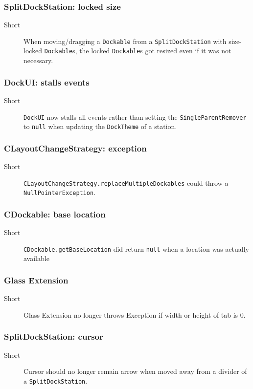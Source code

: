 \documentclass[a4paper,10pt]{article}
\newcommand{\src}[1]{\lstinline[basicstyle=\normalsize\ttfamily,keywordstyle=\normalsize\ttfamily,identifierstyle=\normalsize\ttfamily]|#1|}
\newcommand{\short}{\item[Short]}
\begin{document}
\subsubsection{SplitDockStation: locked size}
\begin{description}
 \short When moving/dragging a \src{Dockable} from a \src{SplitDockStation} with size-locked \src{Dockable}s, the locked \src{Dockable}s got resized even if it was not necessary.
\end{description}

\subsubsection{DockUI: stalls events}
\begin{description}
 \short \src{DockUI} now stalls all events rather than setting the \src{SingleParentRemover} to \src{null} when updating the \src{DockTheme} of a station.
\end{description}


\subsubsection{CLayoutChangeStrategy: exception}
\begin{description}
 \short \src{CLayoutChangeStrategy.replaceMultipleDockables} could throw a \src{NullPointerException}.
\end{description}

\subsubsection{CDockable: base location}
\begin{description}
 \short \src{CDockable.getBaseLocation} did return \src{null} when a location was actually available
\end{description}

\subsubsection{Glass Extension}
\begin{description}
 \short Glass Extension no longer throws Exception if width or height of tab is 0.
\end{description}

\subsubsection{SplitDockStation: cursor}
\begin{description}
 \short Cursor should no longer remain arrow when moved away from a divider of a \src{SplitDockStation}.
\end{description}
\end{document}
